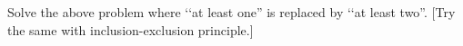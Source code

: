 Solve the above problem where \lq\lq at least one'' is replaced by
\lq\lq at least two''. [Try the same with inclusion-exclusion
principle.]
